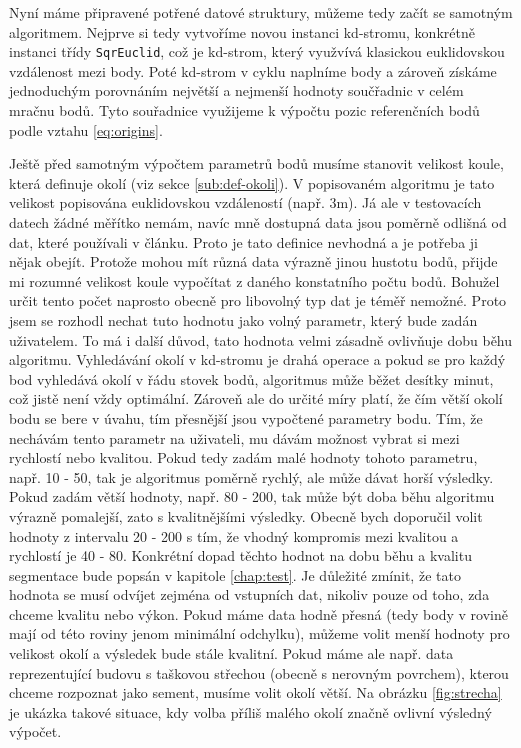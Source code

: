 \documentclass[11pt,twoside,a4paper]{book}
\begin{document}
Nyní máme připravené potřené datové struktury, můžeme tedy začít se samotným algoritmem. Nejprve si tedy vytvoříme novou instanci kd-stromu, konkrétně instanci třídy \verb|SqrEuclid|, což je kd-strom, který využvívá klasickou euklidovskou vzdálenost mezi body. Poté kd-strom  v cyklu naplníme body a zároveň získáme jednoduchým porovnáním  největší a nejmenší hodnoty součřadnic v celém mračnu bodů. Tyto souřadnice využijeme k výpočtu pozic referenčních bodů podle vztahu \ref{eq:origins}.

Ještě před samotným výpočtem parametrů bodů musíme stanovit velikost koule, která definuje okolí (viz sekce \ref{sub:def-okoli}). V popisovaném algoritmu je tato velikost popisována euklidovskou vzdáleností (např. 3m). Já ale v testovacích datech žádné měřítko nemám, navíc mně dostupná data jsou poměrně odlišná od dat, které používali v článku. Proto je tato definice nevhodná a je potřeba ji nějak obejít. Protože mohou mít různá data výrazně jinou hustotu bodů, přijde mi rozumné velikost koule vypočítat z daného konstatního počtu bodů. Bohužel určit tento počet naprosto obecně pro libovolný typ dat je téměř nemožné. Proto jsem se rozhodl nechat tuto hodnotu jako volný parametr, který bude zadán uživatelem. To má i další důvod, tato hodnota velmi zásadně ovlivňuje dobu běhu algoritmu. Vyhledávání okolí v kd-stromu je drahá operace a pokud se pro každý bod vyhledává okolí v řádu stovek bodů, algoritmus může běžet desítky minut, což jistě není vždy optimální. Zároveň ale do určité míry platí, že čím větší okolí bodu se bere v úvahu, tím přesnější jsou vypočtené parametry bodu. Tím, že nechávám tento parametr na uživateli, mu dávám možnost vybrat si mezi rychlostí nebo kvalitou. Pokud tedy zadám malé hodnoty tohoto parametru, např. 10 - 50, tak je algoritmus poměrně rychlý, ale může dávat horší výsledky. Pokud zadám větší hodnoty, např. 80 - 200, tak může být doba běhu algoritmu výrazně pomalejší, zato s kvalitnějšími výsledky. Obecně bych doporučil volit hodnoty z intervalu 20 - 200 s tím, že vhodný kompromis mezi kvalitou a rychlostí je 40 - 80. Konkrétní dopad těchto hodnot na dobu běhu a kvalitu segmentace bude popsán v kapitole \ref{chap:test}. Je důležité zmínit, že tato hodnota se musí odvíjet zejména od vstupních dat, nikoliv pouze od toho, zda chceme kvalitu nebo výkon. Pokud máme data hodně přesná (tedy body v rovině mají od této roviny jenom minimální odchylku), můžeme volit menší hodnoty pro velikost okolí a výsledek bude stále kvalitní. Pokud máme ale např. data reprezentující budovu s taškovou střechou (obecně s nerovným povrchem), kterou chceme rozpoznat jako sement, musíme volit okolí větší. Na obrázku \ref{fig:strecha} je ukázka takové situace, kdy volba příliš malého okolí značně ovlivní výsledný výpočet.
\end{document}
